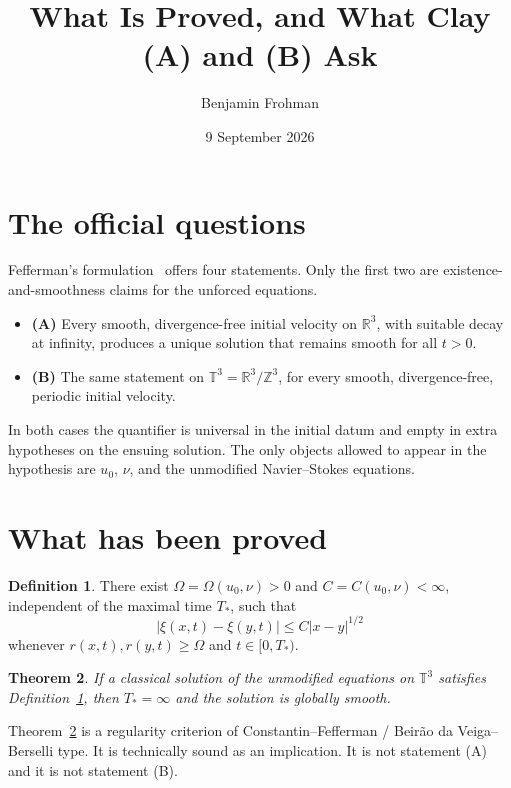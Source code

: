 \documentclass[11pt,a4paper]{article}
\title{What Is Proved, and What Clay (A) and (B) Ask}
\author{Benjamin Frohman}
\date{9 September 2026}
\newtheorem{theorem}{Theorem}
\theoremstyle{definition}
\newtheorem{definition}[theorem]{Definition}
\theoremstyle{remark}
\newcommand{\R}{\mathbb{R}}
\newcommand{\T}{\mathbb{T}}
\newcommand{\Z}{\mathbb{Z}}
\newcommand{\abs}[1]{\lvert#1\rvert}
\begin{document}
\maketitle

\section{The official questions}

Fefferman's formulation~\cite{Fefferman2000} offers four statements. Only the first two are existence-and-smoothness claims for the unforced equations.

\begin{itemize}[leftmargin=1.6em]
\item \textbf{(A)} Every smooth, divergence-free initial velocity on $\R^3$, with suitable decay at infinity, produces a unique solution that remains smooth for all $t>0$.
\item \textbf{(B)} The same statement on $\T^3=\R^3/\Z^3$, for every smooth, divergence-free, periodic initial velocity.
\end{itemize}

In both cases the quantifier is universal in the initial datum and empty in extra hypotheses on the ensuing solution. The only objects allowed to appear in the hypothesis are $u_0$, $\nu$, and the unmodified Navier--Stokes equations.

\section{What has been proved}

\begin{definition}
\label{def:71}
There exist $\Omega=\Omega(u_0,\nu)>0$ and $C=C(u_0,\nu)<\infty$, independent of the maximal time $T_*$, such that
\[
\abs{\xi(x,t)-\xi(y,t)}\le C\abs{x-y}^{1/2}
\]
whenever $r(x,t),r(y,t)\ge\Omega$ and $t\in[0,T_*)$.
\end{definition}

\begin{theorem}
\label{thm:crit}
If a classical solution of the unmodified equations on $\T^3$ satisfies Definition~\ref{def:71}, then $T_*=\infty$ and the solution is globally smooth.
\end{theorem}

Theorem~\ref{thm:crit} is a regularity criterion of Constantin--Fefferman / Beir\~ao da Veiga--Berselli type. It is technically sound as an implication. It is not statement (A) and it is not statement (B).
\end{document}
